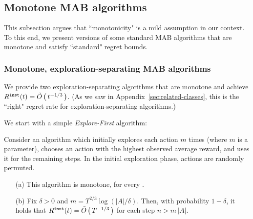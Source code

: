 
\subsection{Monotone MAB algorithms}
\label{app:MAB-monotone}

This subsection argues that ``monotonicity" is a mild assumption in our context. To this end, we present versions of some standard MAB algorithms that are monotone and satisfy ``standard" regret bounds.


\subsubsection{Monotone, exploration-separating MAB algorithms}
\label{app:MAB-monotone-naive}



We provide two exploration-separating algorithms that are monotone and achieve $R^{\mathtt{inst}}(t)=\tilde{O}\left(\,t^{-1/3}\,\right)$. (As we saw in Appendix~\ref{sec:related-classes}, this is the ``right" regret rate for exploration-separating algorithms.)


We start with a simple \emph{Explore-First} algorithm: 

\begin{lemma}
Consider an algorithm which initially explores each action $m$ times (where $m$ is a parameter), chooses an action  with the highest observed average reward, and uses it for the remaining steps. In the initial exploration phase, actions are randomly permuted. 
\begin{itemize}
\item[(a)] This algorithm is monotone, for every \MRV.

\item[(b)] Fix $\delta>0$ and 
    $m = T^{2/3}\log(|A|/\delta)$.
Then, with probability $1-\delta$, it holds that  
    $R^{\mathtt{inst}}(t)=\tilde{O}\left(\,T^{-1/3}\,\right)$
for each step $n> m\,|A|$.
\end{itemize}
\end{lemma}

